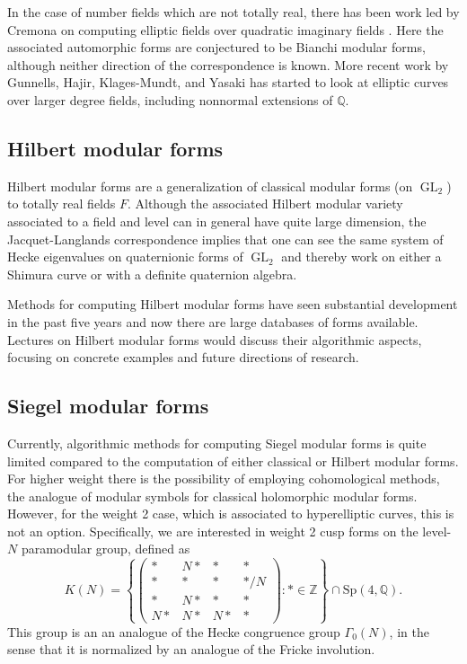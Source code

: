 \documentclass[12pt]{amsart}
\DeclareMathOperator{\GL}{GL}
\numberwithin{equation}{section}
\newcommand{\Q}{\mathbb Q}
\newcommand{\Z}{\mathbb Z}
\begin{document}
In the case of number fields which are not totally real, there has
been work led by Cremona on computing elliptic fields over quadratic
imaginary fields \cite{cremona1, cremona-lingham, cremona}.  Here the
associated automorphic forms are
conjectured to be Bianchi modular forms, although neither direction of
the correspondence is known.  More recent work by Gunnells,
Hajir, Klages-Mundt, and Yasaki \cite{complexcubic, neg23,quartic}
has started to look at elliptic curves over larger degree
fields, including nonnormal extensions of $\Q$.

\subsection{Hilbert modular forms}

Hilbert modular forms are a generalization of classical modular forms
(on $\GL_2$) to totally real fields $F$.  Although the associated 
Hilbert modular variety associated to a field and level can in general
have quite large dimension, the Jacquet-Langlands correspondence
implies that one can see the same system of Hecke eigenvalues
on quaternionic forms of $\GL_2$ and thereby work on either
a Shimura curve or with a definite quaternion algebra.

Methods for computing Hilbert modular forms have seen substantial
development in the past five years and now there are large databases
of forms available.  Lectures on Hilbert modular forms would discuss
their algorithmic aspects, focusing on concrete examples and 
future directions of research.

\subsection{Siegel modular forms}

Currently, algorithmic methods for computing Siegel modular 
forms is quite limited compared to
the computation of either classical or Hilbert modular forms.  For
higher weight there is the possibility of employing cohomological
methods, the analogue of modular symbols for classical holomorphic
modular forms.  However, for the weight 2 case, which is associated
to hyperelliptic curves, this is not an option.  Specifically, we are
interested in weight 2 cusp forms on the level-$N$ paramodular group,
defined as
$$
K(N)=\left\{
\left(\begin{matrix}
  * & N* & * &*\\
* & * & * & */N\\
* & N* &*&*\\
N*&N*&N*&*
\end{matrix}\right)
:
*\in{\Z}\right\}\cap \mathrm{Sp}(4, \Q).
$$
This group is an an analogue of the Hecke congruence group
$\Gamma_0(N)$, in the sense that it is normalized by an analogue of
the Fricke involution.
\end{document}
